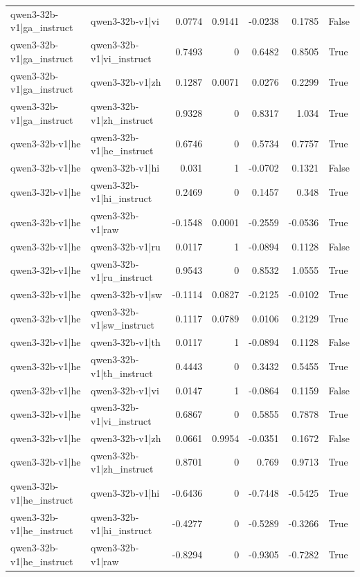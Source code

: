 \begin{table}
\begin{tabular}{l l r r r r l}
qwen3-32b-v1|ga_instruct & qwen3-32b-v1|vi & 0.0774 & 0.9141 & -0.0238 & 0.1785 & False \\
qwen3-32b-v1|ga_instruct & qwen3-32b-v1|vi_instruct & 0.7493 & 0 & 0.6482 & 0.8505 & True \\
qwen3-32b-v1|ga_instruct & qwen3-32b-v1|zh & 0.1287 & 0.0071 & 0.0276 & 0.2299 & True \\
qwen3-32b-v1|ga_instruct & qwen3-32b-v1|zh_instruct & 0.9328 & 0 & 0.8317 & 1.034 & True \\
qwen3-32b-v1|he & qwen3-32b-v1|he_instruct & 0.6746 & 0 & 0.5734 & 0.7757 & True \\
qwen3-32b-v1|he & qwen3-32b-v1|hi & 0.031 & 1 & -0.0702 & 0.1321 & False \\
qwen3-32b-v1|he & qwen3-32b-v1|hi_instruct & 0.2469 & 0 & 0.1457 & 0.348 & True \\
qwen3-32b-v1|he & qwen3-32b-v1|raw & -0.1548 & 0.0001 & -0.2559 & -0.0536 & True \\
qwen3-32b-v1|he & qwen3-32b-v1|ru & 0.0117 & 1 & -0.0894 & 0.1128 & False \\
qwen3-32b-v1|he & qwen3-32b-v1|ru_instruct & 0.9543 & 0 & 0.8532 & 1.0555 & True \\
qwen3-32b-v1|he & qwen3-32b-v1|sw & -0.1114 & 0.0827 & -0.2125 & -0.0102 & True \\
qwen3-32b-v1|he & qwen3-32b-v1|sw_instruct & 0.1117 & 0.0789 & 0.0106 & 0.2129 & True \\
qwen3-32b-v1|he & qwen3-32b-v1|th & 0.0117 & 1 & -0.0894 & 0.1128 & False \\
qwen3-32b-v1|he & qwen3-32b-v1|th_instruct & 0.4443 & 0 & 0.3432 & 0.5455 & True \\
qwen3-32b-v1|he & qwen3-32b-v1|vi & 0.0147 & 1 & -0.0864 & 0.1159 & False \\
qwen3-32b-v1|he & qwen3-32b-v1|vi_instruct & 0.6867 & 0 & 0.5855 & 0.7878 & True \\
qwen3-32b-v1|he & qwen3-32b-v1|zh & 0.0661 & 0.9954 & -0.0351 & 0.1672 & False \\
qwen3-32b-v1|he & qwen3-32b-v1|zh_instruct & 0.8701 & 0 & 0.769 & 0.9713 & True \\
qwen3-32b-v1|he_instruct & qwen3-32b-v1|hi & -0.6436 & 0 & -0.7448 & -0.5425 & True \\
qwen3-32b-v1|he_instruct & qwen3-32b-v1|hi_instruct & -0.4277 & 0 & -0.5289 & -0.3266 & True \\
qwen3-32b-v1|he_instruct & qwen3-32b-v1|raw & -0.8294 & 0 & -0.9305 & -0.7282 & True \\

\end{tabular}
\end{table}
